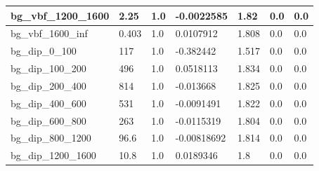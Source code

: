\documentclass[a4paper, 10pt]{article}
\begin{document}
\begin{table}[H]
\begin{center}
\begin{tabular}{|m{23.0mm}|m{23.0mm}|m{18.0mm}|m{19.0mm}|m{19.0mm}|m{19.0mm}|m{19.0mm}|}
      \hline
      {\cellcolor{white}         bg\_vbf\_1200\_1600}& {\cellcolor{white}         2.25}& {\cellcolor{white}         1.0}& {\cellcolor{white}         -0.0022585}& {\cellcolor{white}         1.82}& {\cellcolor{green}         0.0}& {\cellcolor{green}         0.0}\\
      \hline
      {\cellcolor{white}         bg\_vbf\_1600\_inf}& {\cellcolor{white}         0.403}& {\cellcolor{white}         1.0}& {\cellcolor{white}         0.0107912}& {\cellcolor{white}         1.808}& {\cellcolor{green}         0.0}& {\cellcolor{green}         0.0}\\
      \hline
      {\cellcolor{white}         bg\_dip\_0\_100}& {\cellcolor{white}         117}& {\cellcolor{white}         1.0}& {\cellcolor{white}         -0.382442}& {\cellcolor{white}         1.517}& {\cellcolor{green}         0.0}& {\cellcolor{green}         0.0}\\
      \hline
      {\cellcolor{white}         bg\_dip\_100\_200}& {\cellcolor{white}         496}& {\cellcolor{white}         1.0}& {\cellcolor{white}         0.0518113}& {\cellcolor{white}         1.834}& {\cellcolor{green}         0.0}& {\cellcolor{green}         0.0}\\
      \hline
      {\cellcolor{white}         bg\_dip\_200\_400}& {\cellcolor{white}         814}& {\cellcolor{white}         1.0}& {\cellcolor{white}         -0.013668}& {\cellcolor{white}         1.825}& {\cellcolor{green}         0.0}& {\cellcolor{green}         0.0}\\
      \hline
      {\cellcolor{white}         bg\_dip\_400\_600}& {\cellcolor{white}         531}& {\cellcolor{white}         1.0}& {\cellcolor{white}         -0.0091491}& {\cellcolor{white}         1.822}& {\cellcolor{green}         0.0}& {\cellcolor{green}         0.0}\\
      \hline
      {\cellcolor{white}         bg\_dip\_600\_800}& {\cellcolor{white}         263}& {\cellcolor{white}         1.0}& {\cellcolor{white}         -0.0115319}& {\cellcolor{white}         1.804}& {\cellcolor{green}         0.0}& {\cellcolor{green}         0.0}\\
      \hline
      {\cellcolor{white}         bg\_dip\_800\_1200}& {\cellcolor{white}         96.6}& {\cellcolor{white}         1.0}& {\cellcolor{white}         -0.00818692}& {\cellcolor{white}         1.814}& {\cellcolor{green}         0.0}& {\cellcolor{green}         0.0}\\
      \hline
      {\cellcolor{white}         bg\_dip\_1200\_1600}& {\cellcolor{white}         10.8}& {\cellcolor{white}         1.0}& {\cellcolor{white}         0.0189346}& {\cellcolor{white}         1.8}& {\cellcolor{green}         0.0}& {\cellcolor{green}         0.0}\\

\end{tabular}
\end{center}
\end{table}
\end{document}
